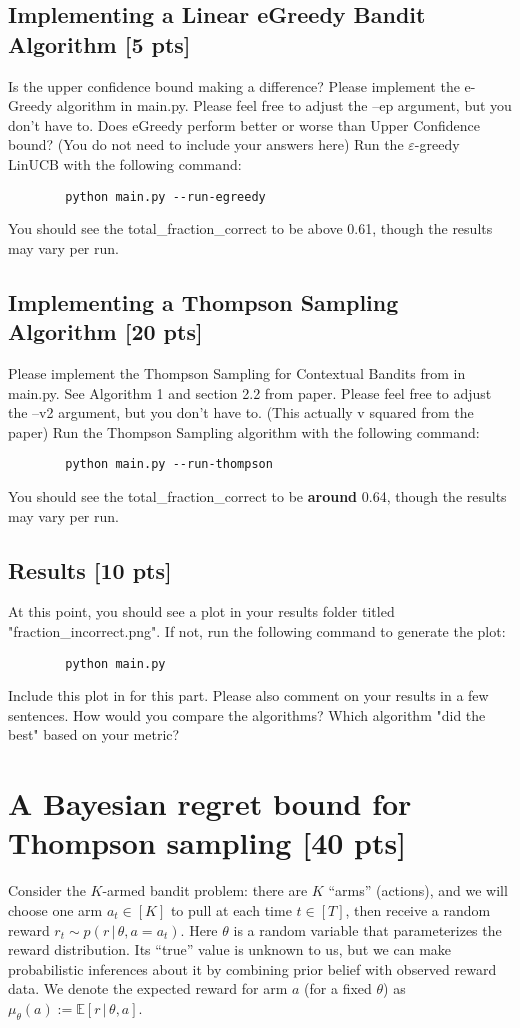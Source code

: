 \documentclass[11pt]{article}
\newcommand{\E}{\mathbb E}
\newcommand{\given}{\,|\,}
\let\epsilon\varepsilon
\begin{document}
\subsection{Implementing a Linear eGreedy Bandit Algorithm [5 pts]}
Is the upper confidence bound making a difference? Please implement the e-Greedy algorithm in main.py. Please feel free to adjust the --ep argument, but you don't have to. Does eGreedy perform better or worse than Upper Confidence bound? (You do not need to include your answers here)  Run the $\epsilon$-greedy LinUCB with the following command:
\begin{verbatim}
        python main.py --run-egreedy
\end{verbatim}
You should see the total\_fraction\_correct to be above 0.61, though the results may vary per run.

\subsection{Implementing a Thompson Sampling Algorithm [20 pts]}
Please implement the Thompson Sampling for Contextual Bandits from  \cite{agrawal2013thompson} in main.py. See Algorithm 1 and section 2.2 from paper. Please feel free to adjust the --v2 argument, but you don't have to.  (This actually v squared from the paper) Run the Thompson Sampling algorithm with the following command:
\begin{verbatim}
        python main.py --run-thompson
\end{verbatim}
You should see the total\_fraction\_correct to be \textbf{around} 0.64, though the results may vary per run.

\subsection{Results [10 pts]}
At this point, you should see a plot in your results folder titled "fraction\_incorrect.png". If not, run the following command to generate the plot:
\begin{verbatim}
        python main.py
\end{verbatim}
Include this plot in for this part. Please also comment on your results in a few sentences. How would you compare the algorithms? Which algorithm "did the best" based on your metric?

\section{A Bayesian regret bound for Thompson sampling [40 pts]}
Consider the $K$-armed bandit problem: there are $K$ ``arms'' (actions), and we will choose one arm $a_t \in [K]$ to pull at each time $t \in [T]$, then receive a random reward $r_t \sim p(r \given \theta, a = a_t)$. Here $\theta$ is a random variable that parameterizes the reward distribution. Its ``true'' value is unknown to us, but we can make probabilistic inferences about it by combining prior belief with observed reward data. We denote the expected reward for arm $a$ (for a fixed $\theta$) as $\mu_\theta(a) := \E[r \given \theta, a]$. 
\end{document}
